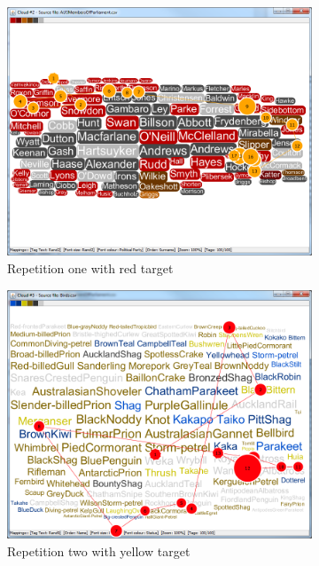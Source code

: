 \begin{figure}[!htb]
\centering
\begin{subfigure}{.5\textwidth}
  \centering
  \includegraphics[scale=0.25]{featuresearchgazetrial1.png}
  \caption{Repetition one with red target}
\end{subfigure}%
\begin{subfigure}{.5\textwidth}
  \centering
  \includegraphics[scale=0.25]{featuresearchgazetrial2.png}
  \caption{Repetition two with yellow target}
\end{subfigure}
\begin{subfigure}{.5\textwidth}

\end{subfigure}
\end{figure}
